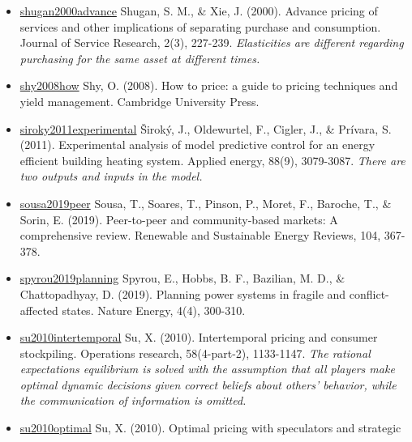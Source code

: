 \documentclass[letterpaper,8pt,twocolumn,twoside,]{pinp}
\begin{document}
\begin{itemize}
{  discussed in section 11-4.}
\item
  \href{https://journals.sagepub.com/doi/abs/10.1177/109467050023001?casa_token=nHdK2gtk0ZUAAAAA:JZm0jvC2O9C0qr7WPZZphEZINBT2hpYCLNSB5hykwAO1buCHLim0JzlleOeUOwCv0uIZWbmfE8vI}{shugan2000advance}
  Shugan, S. M., \& Xie, J. (2000). Advance pricing of services and
  other implications of separating purchase and consumption. Journal of
  Service Research, 2(3), 227-239. \emph{Elasticities are different
  regarding purchasing for the same asset at different times.}
\item
  \href{https://www.cambridge.org/core/books/how-to-price/27B182881BC668B688F8DA949DF52554}{shy2008how}
  Shy, O. (2008). How to price: a guide to pricing techniques and yield
  management. Cambridge University Press.
\item
  \href{https://www.sciencedirect.com/science/article/pii/S0306261911001668}{siroky2011experimental}
  Široký, J., Oldewurtel, F., Cigler, J., \& Prívara, S. (2011).
  Experimental analysis of model predictive control for an energy
  efficient building heating system. Applied energy, 88(9), 3079-3087.
  \emph{There are two outputs and inputs in the model.}
\item
  \href{https://www.sciencedirect.com/science/article/pii/S1364032119300462}{sousa2019peer}
  Sousa, T., Soares, T., Pinson, P., Moret, F., Baroche, T., \& Sorin,
  E. (2019). Peer-to-peer and community-based markets: A comprehensive
  review. Renewable and Sustainable Energy Reviews, 104, 367-378.
\item
  \href{https://www.nature.com/articles/s41560-019-0346-x}{spyrou2019planning}
  Spyrou, E., Hobbs, B. F., Bazilian, M. D., \& Chattopadhyay, D.
  (2019). Planning power systems in fragile and conflict-affected
  states. Nature Energy, 4(4), 300-310.
\item
  \href{https://pubsonline.informs.org/doi/abs/10.1287/opre.1090.0797?casa_token=ToDJ8Q4lVrwAAAAA:PMHqig45Pa7ai5FpOPhTgs-4U8cI_dbkkScDXU9gZBcPngxvOQnVoEJ_qENYKTfUHjLoVAGiwg}{su2010intertemporal}
  Su, X. (2010). Intertemporal pricing and consumer stockpiling.
  Operations research, 58(4-part-2), 1133-1147. \emph{The rational
  expectations equilibrium is solved with the assumption that all
  players make optimal dynamic decisions given correct beliefs about
  others' behavior, while the communication of information is omitted.}
\item
  \href{https://pubsonline.informs.org/doi/10.1287/mnsc.1090.1075}{su2010optimal}
  Su, X. (2010). Optimal pricing with speculators and strategic

\end{itemize}
\end{document}
